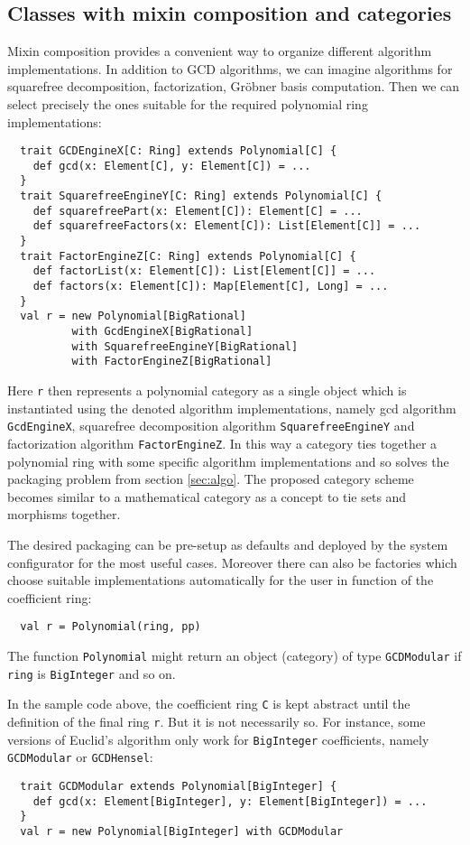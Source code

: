 \documentclass{llncs}
\newcommand{\code}[1]{\texttt{#1}}
\begin{document}
\subsection{Classes with mixin composition and categories} %

Mixin composition provides a convenient way to organize different
algorithm implementations. In addition to GCD algorithms, we can
imagine algorithms for squarefree decomposition, factorization,
Gr\"obner basis computation. Then we can select precisely the ones
suitable for the required polynomial ring implementations:
%
\begin{verbatim}
  trait GCDEngineX[C: Ring] extends Polynomial[C] {
    def gcd(x: Element[C], y: Element[C]) = ...
  }
  trait SquarefreeEngineY[C: Ring] extends Polynomial[C] {
    def squarefreePart(x: Element[C]): Element[C] = ...
    def squarefreeFactors(x: Element[C]): List[Element[C]] = ...
  }
  trait FactorEngineZ[C: Ring] extends Polynomial[C] {
    def factorList(x: Element[C]): List[Element[C]] = ...
    def factors(x: Element[C]): Map[Element[C], Long] = ...
  }
  val r = new Polynomial[BigRational]
          with GcdEngineX[BigRational] 
          with SquarefreeEngineY[BigRational]
          with FactorEngineZ[BigRational]
\end{verbatim}
%
Here \code{r} then represents a polynomial category as a single object
which is instantiated using the denoted algorithm implementations,
namely gcd algorithm \code{Gcd\-Engine\-X}, squarefree decomposition
algorithm \code{Square\-free\-Engine\-Y} and factorization algorithm
\code{Factor\-Engine\-Z}. In this way a category ties together a
polynomial ring with some specific algorithm implementations and so
solves the packaging problem from section \ref{sec:algo}.
The proposed category scheme becomes similar to a mathematical
category as a concept to tie sets and morphisms together.

The desired packaging can be pre-setup as defaults and deployed by the
system configurator for the most useful cases. Moreover there can also
be factories which choose suitable implementations automatically for
the user in function of the coefficient ring:
%
\begin{verbatim}
  val r = Polynomial(ring, pp)
\end{verbatim}
%
The function \code{Poly\-nomial} might return an object (category) of
type \code{GCD\-Modular} if \code{ring} is \code{Big\-Integer} and
so on.

In the sample code above, the coefficient ring \code{C} is kept abstract until
the definition of the final ring \code{r}. But it is not necessarily so. For
instance, some versions of Euclid's algorithm only work for \code{Big\-Integer}
coefficients, namely \code{GCD\-Modular} or \code{GCD\-Hensel}:
%
\begin{verbatim}
  trait GCDModular extends Polynomial[BigInteger] {
    def gcd(x: Element[BigInteger], y: Element[BigInteger]) = ...
  }
  val r = new Polynomial[BigInteger] with GCDModular
\end{verbatim}
\end{document}
